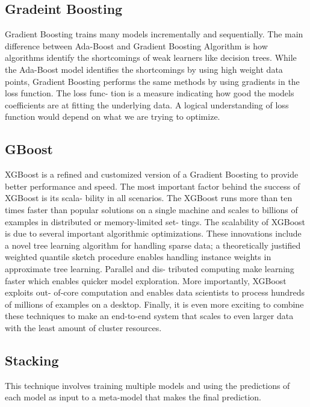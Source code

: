 \documentclass[final]{cvpr}
\begin{document}
\subsection{Gradeint Boosting}

Gradient Boosting trains many models incrementally and
sequentially. The main difference between Ada-Boost and
Gradient Boosting Algorithm is how algorithms identify the
shortcomings of weak learners like decision trees. While the
Ada-Boost model identifies the shortcomings by using high
weight data points, Gradient Boosting performs the same
methods by using gradients in the loss function. The loss func-
tion is a measure indicating how good the models coefficients
are at fitting the underlying data. A logical understanding of
loss function would depend on what we are trying to optimize.

\subsection{GBoost}

XGBoost is a refined and customized version of a Gradient
Boosting to provide better performance and speed. The most
important factor behind the success of XGBoost is its scala-
bility in all scenarios. The XGBoost runs more than ten times
faster than popular solutions on a single machine and scales
to billions of examples in distributed or memory-limited set-
tings. The scalability of XGBoost is due to several important
algorithmic optimizations. These innovations include a novel
tree learning algorithm for handling sparse data; a theoretically
justified weighted quantile sketch procedure enables handling
instance weights in approximate tree learning. Parallel and dis-
tributed computing make learning faster which enables quicker
model exploration. More importantly, XGBoost exploits out-
of-core computation and enables data scientists to process
hundreds of millions of examples on a desktop. Finally, it
is even more exciting to combine these techniques to make
an end-to-end system that scales to even larger data with the
least amount of cluster resources.

\subsection{Stacking}

This technique involves training multiple models and using the predictions of each model as input to a meta-model that makes the final prediction.
\end{document}
